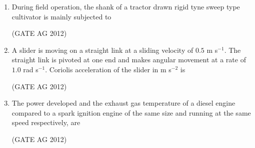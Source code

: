 \documentclass[journal]{IEEEtran}
\begin{document}
\begin{enumerate}
\medskip

\item
During field operation, the shank of a tractor drawn rigid tyne sweep type cultivator is mainly subjected to
\begin{enumerate}
\end{enumerate}
\hfill(GATE AG 2012)\\

\medskip

\item
A slider is moving on a straight link at a sliding velocity of $0.5$ m s$^{-1}$. The straight link is pivoted at one end and makes angular movement at a rate of $1.0$ rad s$^{-1}$. Coriolis acceleration of the slider in m s$^{-2}$ is
\begin{enumerate}
\end{enumerate}
\hfill(GATE AG 2012)\\

\medskip

\item
The power developed and the exhaust gas temperature of a diesel engine compared to a spark ignition engine of the same size and running at the same speed respectively, are
\begin{enumerate}
\end{enumerate}
\hfill(GATE AG 2012)\\

\medskip


\end{enumerate}
\end{document}
